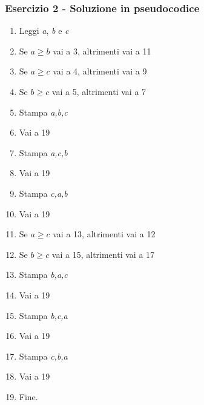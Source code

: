 \documentclass[aspectratio=169,]{beamer}
\begin{document}
\begin{frame}
\frametitle{Esercizio 2 - Soluzione in pseudocodice}
\begin{multicols}{2}
\begin{enumerate}
	\item Leggi \emph{a}, \emph{b} e \emph{c}
	\item Se $a \geq b$ vai a 3, altrimenti vai a 11

	\item Se $a \geq c$ vai a 4, altrimenti vai a 9
	\item Se $b \geq c$ vai a 5, altrimenti vai a 7
	\item Stampa \emph{a,b,c}
	\item Vai a 19
	\item Stampa \emph{a,c,b}
	\item Vai a 19
	\item Stampa \emph{c,a,b}
	\item Vai a 19

	\item Se $a \geq c$ vai a 13, altrimenti vai a 12
	\item Se $b \geq c$ vai a 15, altrimenti vai a 17
	\item Stampa \emph{b,a,c}
	\item Vai a 19
	\item Stampa \emph{b,c,a}
	\item Vai a 19
	\item Stampa \emph{c,b,a}
	\item Vai a 19

	\item Fine.
\end{enumerate}
\end{multicols}
\end{frame}
\fi
\end{document}
